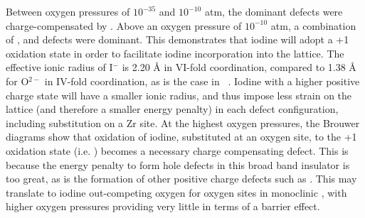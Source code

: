 Between oxygen pressures of $10^{-35}$ and $10^{-10}$ atm, the dominant defects were  charge-compensated by . Above an oxygen pressure of $10^{-10}$ atm, a combination of ,  and  defects were dominant. This demonstrates that iodine will adopt a +1 oxidation state in order to facilitate iodine incorporation into the lattice. The effective ionic radius of I$^{-}$ is 2.20 \r{A} in VI-fold coordination, compared to 1.38 \r{A} for O$^{2-}$ in IV-fold coordination, as is the case in \zirconia\ \cite{Shannon1976}. Iodine with a higher positive charge state will have a smaller ionic radius, and thus impose less strain on the lattice (and therefore a smaller energy penalty) in each defect configuration, including substitution on a Zr site. At the highest oxygen pressures, the Brouwer diagrams show that oxidation of iodine, substituted at an oxygen site, to the +1 oxidation state (i.e. ) becomes a necessary charge compensating defect. This is because the energy penalty to form hole defects in this broad band insulator is too great, as is the formation of other positive charge defects such as . This may translate to iodine out-competing oxygen for oxygen sites in monoclinic \zirconia , with higher oxygen pressures providing very little in terms of a barrier effect. 


